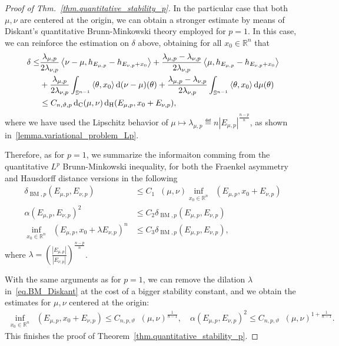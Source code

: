 \documentclass[a4paper, 10pt, twoside]{amsart}
\numberwithin{equation}{section}
\theoremstyle{plain}
\theoremstyle{definition}
\DeclareMathOperator{\BM}{\mathrm{BM}}
\DeclareMathOperator{\dc}{\mathrm{d}_\mathrm{C}}
\DeclareMathOperator{\dH}{\mathrm{d}_\mathrm{H}}
\begin{document}
\begin{proof}[Proof of Thm.~\ref{thm.quantitative_stability_p}]
    In the particular case that both $\mu,\nu$ are centered at the origin, we can obtain a stronger estimate by means of Diskant's quantitative Brunn-Minkowski theory employed for $p=1$. In this case, we can reinforce the estimation on $\delta$ above, obtaining for all $x_0 \in \mathbb{R}^n$ that 
    \begin{align*}
        \delta \le&
        \frac{\lambda_{\mu,p}}{2\lambda_{\nu,p}} 
        \inner{\nu - \mu, h_{E_{\mu,p}}- h_{E_{\nu,p} + x_0}}
        + 
        \frac{\lambda_{\mu,p} - \lambda_{\nu,p}}{2\lambda_{\nu,p}} 
        \inner{\mu,  h_{E_{\mu,p}}- h_{E_{\nu,p} + x_0}} \\
        &+ 
        \frac{\lambda_{\mu,p}}{2\lambda_{\nu,p}} 
        \int_{\mathbb{S}^{n-1}}
        \inner{\theta, x_0}\dd(\nu - \mu)(\theta)
        +
        \frac{\lambda_{\mu,p} - \lambda_{\nu,p}}{2\lambda_{\nu,p}} 
        \int_{\mathbb{S}^{n-1}}
        \inner{\theta,x_0} \dd \mu (\theta)\\ 
        &\le 
        C_{n,\vartheta,p} \dc(\mu,\nu) \dH(E_{\mu,p}, x_0 + E_{\nu,p}),
   \end{align*}
   where we have used the Lipschitz behavior of $\mu \mapsto \lambda_{\mu,p} \eqdef n |E_{\mu,p}|^{\frac{n-p}{n}}$, as shown in~\ref{lemma.variational_problem_Lp}.

   Therefore, as for $p=1$, we summarize the informaiton comming from the quantitative $L^p$ Brunn-Minkowski inequality, for both the Fraenkel asymmetry and Hausdorff distance versions in the following
      \begin{align}
        \label{eq.estimate_deltaBM}
        \delta_{\BM,p}(E_{\mu,p},E_{\nu,p}) 
        &\le 
        C_1 \dc(\mu,\nu) \inf_{x_0 \in \mathbb{R}^n} \dH(E_{\mu,p}, x_0 + E_{\nu,p})\\
        \label{eq.BM_AMP}
        \alpha(E_{\mu,p},E_{\nu,p})^2
        &\le 
        C_2 \delta_{\BM,p}(E_{\mu,p},E_{\nu,p}) \\
        \label{eq.BM_Diskant}
        \inf_{x_0 \in \mathbb{R}^n} 
        \dH(E_{\mu,p}, x_0 + \lambda E_{\nu,p})^n
        &\le 
        C_3 \delta_{\BM,p}(E_{\mu,p},E_{\nu,p}),
   \end{align}  
   where $\lambda = \left(\frac{|E_{\mu,p}|}{|E_{\nu,p}|}\right)^{\frac{n-p}{n}}$. 

   With the same arguments as for $p=1$, we can remove the dilation $\lambda$ in~\eqref{eq.BM_Diskant} at the cost of a bigger stability constant, and we obtain the estimates for $\mu,\nu$ centered at the origin:
    \begin{align*}
        \inf_{x_0 \in \mathbb{R}^n} 
        \dH(E_{\mu,p}, x_0 + E_{\nu,p})
        \le 
        C_{n,p,\vartheta} {\dc(\mu,\nu)}^{\frac{1}{n-1}}, 
        \quad 
        \alpha(E_{\mu,p},E_{\nu,p})^2
        \le 
        C_{n,p,\vartheta} \dc(\mu,\nu)^{1 + \frac{1}{n-1}}.
    \end{align*}
    This finishes the proof of Theorem~\ref{thm.quantitative_stability_p}.
\end{proof}




\end{document}
